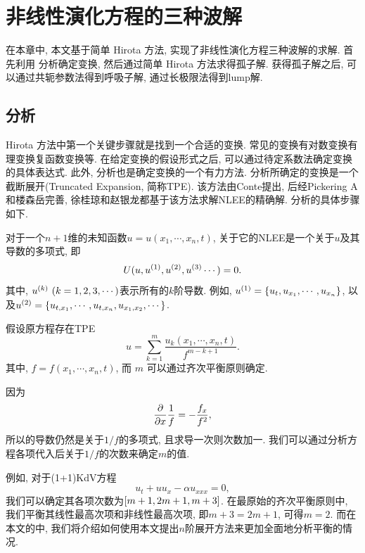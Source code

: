 \chapter{非线性演化方程的三种波解}\label{ch02}
在本章中, 本文基于简单 Hirota 方法, 实现了非线性演化方程三种波解的求解. 首先利用 \Painleve{} 分析确定变换, 然后通过简单 Hirota 方法求得孤子解. 获得孤子解之后, 可以通过共轭参数法得到呼吸子解, 通过长极限法得到lump解. 

\section{\Painleve{}分析}
Hirota 方法中第一个关键步骤就是找到一个合适的变换. 常见的变换有对数变换\D 有理变换\D 复函数变换等. 在给定变换的假设形式之后, 可以通过待定系数法确定变换的具体表达式.  此外, \Painleve{}分析也是确定变换的一个有力方法. \Painleve{}分析所确定的变换是一个\Painleve{}截断展开(Truncated \Painleve{} Expansion, 简称TPE). 该方法由Conte\cite{conte1989invariant}提出, 后经Pickering A\cite{pickering1993new}和楼森岳\cite{lou1998extended}完善, 徐桂琼\cite{xuPHD}和赵银龙\cite{zhaoMST}都基于该方法求解NLEE的精确解. \Painleve{}分析的具体步骤如下. 

对于一个$n+1$维的未知函数$u=u(x_1,\cdots,x_n,t)$, 关于它的NLEE是一个关于$u$及其导数的多项式, 即
\begin{equation}
    U(u,u^{(1)},u^{(2)},u^{(3)}\cdots)=0. \label{oeq}
\end{equation}
其中, $u^{(k)}~(k=1,2,3,\cdots)$表示所有的$k$阶导数. 例如, $u^{(1)}=\left\{u_t,u_{x_1},\cdots,u_{x_n}\right\}$, 以及$u^{(2)}=\left\{u_{t,x_1},\cdots,u_{t,x_n},u_{x_1,x_2},\cdots\right\}$.

假设原方程存在TPE
\begin{equation}
    u=\sum_{k=1}^{m}{\frac{u_k(x_1,\cdots,x_n,t)}{f^{m-k+1}}}. \label{tr}
\end{equation}
其中, $f=f(x_1,\cdots,x_n,t)$, 而 $m$ 可以通过齐次平衡原则确定. 

因为
\begin{equation}
    \frac{\partial}{\partial x}\frac{1}{f}=-\frac{f_x}{f^2},
\end{equation}
所以的导数仍然是关于$1/f$的多项式, 且求导一次则次数加一. 我们可以通过分析方程各项代入后关于$1/f$的次数来确定$m$的值.

例如, 对于(1+1)KdV方程\CITEaaKdV{}
\begin{equation}
    u_t+uu_x-\alpha u_{xxx}=0,
\end{equation}
我们可以确定其各项次数为$\left[m+1,2m+1,m+3\right]$. 在最原始的齐次平衡原则中, 我们平衡其线性最高次项和非线性最高次项, 即$m+3=2m+1$, 可得$m=2$. 而在本文的中, 我们将介绍如何使用本文提出$n$阶展开方法来更加全面地分析平衡的情况. 

